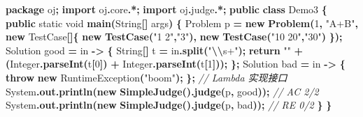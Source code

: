 \documentclass[
  11pt,
]{ctexart}
\newenvironment{Shaded}{\begin{snugshade}}{\end{snugshade}}
\newcommand{\BuiltInTok}[1]{#1}
\newcommand{\CommentTok}[1]{\textcolor[rgb]{0.56,0.35,0.01}{\textit{#1}}}
\newcommand{\ControlFlowTok}[1]{\textcolor[rgb]{0.13,0.29,0.53}{\textbf{#1}}}
\newcommand{\DataTypeTok}[1]{\textcolor[rgb]{0.13,0.29,0.53}{#1}}
\newcommand{\DecValTok}[1]{\textcolor[rgb]{0.00,0.00,0.81}{#1}}
\newcommand{\FunctionTok}[1]{\textcolor[rgb]{0.13,0.29,0.53}{\textbf{#1}}}
\newcommand{\ImportTok}[1]{#1}
\newcommand{\KeywordTok}[1]{\textcolor[rgb]{0.13,0.29,0.53}{\textbf{#1}}}
\newcommand{\NormalTok}[1]{#1}
\newcommand{\OperatorTok}[1]{\textcolor[rgb]{0.81,0.36,0.00}{\textbf{#1}}}
\newcommand{\SpecialCharTok}[1]{\textcolor[rgb]{0.81,0.36,0.00}{\textbf{#1}}}
\newcommand{\StringTok}[1]{\textcolor[rgb]{0.31,0.60,0.02}{#1}}
\begin{document}
\begin{Shaded}
\begin{Highlighting}[]
\KeywordTok{package}\ImportTok{ oj}\OperatorTok{;}
\KeywordTok{import} \ImportTok{oj}\OperatorTok{.}\ImportTok{core}\OperatorTok{.*;}
\KeywordTok{import} \ImportTok{oj}\OperatorTok{.}\ImportTok{judge}\OperatorTok{.*;}
\KeywordTok{public} \KeywordTok{class}\NormalTok{ Demo3 }\OperatorTok{\{}
    \KeywordTok{public} \DataTypeTok{static} \DataTypeTok{void} \FunctionTok{main}\OperatorTok{(}\BuiltInTok{String}\OperatorTok{[]}\NormalTok{ args}\OperatorTok{)} \OperatorTok{\{}
\NormalTok{        Problem p }\OperatorTok{=} \KeywordTok{new} \FunctionTok{Problem}\OperatorTok{(}\DecValTok{1}\OperatorTok{,} \StringTok{"A+B"}\OperatorTok{,} \KeywordTok{new}\NormalTok{ TestCase}\OperatorTok{[]\{} \KeywordTok{new} \FunctionTok{TestCase}\OperatorTok{(}\StringTok{"1 2"}\OperatorTok{,}\StringTok{"3"}\OperatorTok{),} \KeywordTok{new} \FunctionTok{TestCase}\OperatorTok{(}\StringTok{"10 20"}\OperatorTok{,}\StringTok{"30"}\OperatorTok{)} \OperatorTok{\});}
\NormalTok{        Solution good }\OperatorTok{=}\NormalTok{ in }\OperatorTok{{-}\textgreater{}} \OperatorTok{\{} \BuiltInTok{String}\OperatorTok{[]}\NormalTok{ t }\OperatorTok{=}\NormalTok{ in}\OperatorTok{.}\FunctionTok{split}\OperatorTok{(}\StringTok{"}\SpecialCharTok{\textbackslash{}\textbackslash{}}\StringTok{s+"}\OperatorTok{);} \ControlFlowTok{return} \StringTok{""} \OperatorTok{+} \OperatorTok{(}\BuiltInTok{Integer}\OperatorTok{.}\FunctionTok{parseInt}\OperatorTok{(}\NormalTok{t}\OperatorTok{[}\DecValTok{0}\OperatorTok{])} \OperatorTok{+} \BuiltInTok{Integer}\OperatorTok{.}\FunctionTok{parseInt}\OperatorTok{(}\NormalTok{t}\OperatorTok{[}\DecValTok{1}\OperatorTok{]));} \OperatorTok{\};}
\NormalTok{        Solution bad  }\OperatorTok{=}\NormalTok{ in }\OperatorTok{{-}\textgreater{}} \OperatorTok{\{} \ControlFlowTok{throw} \KeywordTok{new} \BuiltInTok{RuntimeException}\OperatorTok{(}\StringTok{"boom"}\OperatorTok{);} \OperatorTok{\};}   \CommentTok{// Lambda 实现接口}
        \BuiltInTok{System}\OperatorTok{.}\FunctionTok{out}\OperatorTok{.}\FunctionTok{println}\OperatorTok{(}\KeywordTok{new} \FunctionTok{SimpleJudge}\OperatorTok{().}\FunctionTok{judge}\OperatorTok{(}\NormalTok{p}\OperatorTok{,}\NormalTok{ good}\OperatorTok{));}   \CommentTok{// AC 2/2}
        \BuiltInTok{System}\OperatorTok{.}\FunctionTok{out}\OperatorTok{.}\FunctionTok{println}\OperatorTok{(}\KeywordTok{new} \FunctionTok{SimpleJudge}\OperatorTok{().}\FunctionTok{judge}\OperatorTok{(}\NormalTok{p}\OperatorTok{,}\NormalTok{ bad}\OperatorTok{));}    \CommentTok{// RE 0/2}
    \OperatorTok{\}}
\OperatorTok{\}}
\end{Highlighting}
\end{Shaded}
\end{document}
